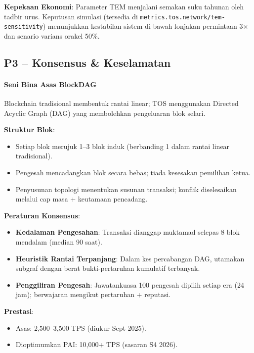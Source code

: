 \documentclass[11pt]{article}
\begin{document}
\textbf{Kepekaan Ekonomi}: Parameter TEM menjalani semakan suku tahunan oleh tadbir urus. Keputusan simulasi (tersedia di \texttt{metrics.tos.network/tem-sensitivity}) menunjukkan kestabilan sistem di bawah lonjakan permintaan 3$\times$ dan senario varians orakel 50\%.

\subsection{P3 -- Konsensus \& Keselamatan}
\label{sec:pillar-consensus}

\paragraph{Seni Bina Asas BlockDAG}
Blockchain tradisional membentuk rantai linear; TOS menggunakan Directed Acyclic Graph (DAG) yang membolehkan pengeluaran blok selari.

\textbf{Struktur Blok}:
\begin{itemize}[noitemsep]
  \item Setiap blok merujuk 1--3 blok induk (berbanding 1 dalam rantai linear tradisional).
  \item Pengesah mencadangkan blok secara bebas; tiada kesesakan pemilihan ketua.
  \item Penyusunan topologi menentukan susunan transaksi; konflik diselesaikan melalui cap masa + keutamaan pencadang.
\end{itemize}

\textbf{Peraturan Konsensus}:
\begin{itemize}[noitemsep]
  \item \textbf{Kedalaman Pengesahan}: Transaksi dianggap muktamad selepas 8 blok mendalam (median 90 saat).
  \item \textbf{Heuristik Rantai Terpanjang}: Dalam kes percabangan DAG, utamakan subgraf dengan berat bukti-pertaruhan kumulatif terbanyak.
  \item \textbf{Penggiliran Pengesah}: Jawatankuasa 100 pengesah dipilih setiap era (24 jam); berwajaran mengikut pertaruhan + reputasi.
\end{itemize}

\textbf{Prestasi}:
\begin{itemize}[noitemsep]
  \item Asas: 2,500--3,500 TPS (diukur Sept 2025).
  \item Dioptimumkan PAI: 10,000+ TPS (sasaran S4 2026).
\end{itemize}
\end{document}
